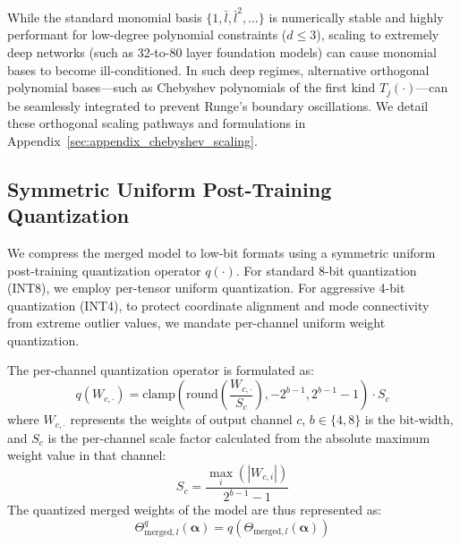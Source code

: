 While the standard monomial basis $\{1, \bar{l}, \bar{l}^2, \dots\}$ is numerically stable and highly performant for low-degree polynomial constraints ($d \le 3$), scaling to extremely deep networks (such as 32-to-80 layer foundation models) can cause monomial bases to become ill-conditioned. In such deep regimes, alternative orthogonal polynomial bases—such as Chebyshev polynomials of the first kind $T_j(\cdot)$—can be seamlessly integrated to prevent Runge's boundary oscillations. We detail these orthogonal scaling pathways and formulations in Appendix~\ref{sec:appendix_chebyshev_scaling}.

\subsection{Symmetric Uniform Post-Training Quantization}
We compress the merged model to low-bit formats using a symmetric uniform post-training quantization operator $q(\cdot)$.
For standard 8-bit quantization (INT8), we employ per-tensor uniform quantization. For aggressive 4-bit quantization (INT4), to protect coordinate alignment and mode connectivity from extreme outlier values, we mandate per-channel uniform weight quantization.

The per-channel quantization operator is formulated as:
\begin{equation}
q(W_{c, \cdot}) = \text{clamp}\left( \text{round}\left( \frac{W_{c, \cdot}}{S_c} \right), -2^{b-1}, 2^{b-1}-1 \right) \cdot S_c
\end{equation}
where $W_{c, \cdot}$ represents the weights of output channel $c$, $b \in \{4, 8\}$ is the bit-width, and $S_c$ is the per-channel scale factor calculated from the absolute maximum weight value in that channel:
\begin{equation}
S_c = \frac{\max_i(|W_{c, i}|)}{2^{b-1} - 1}
\end{equation}
The quantized merged weights of the model are thus represented as:
\begin{equation}
\Theta^q_{\text{merged}, l}(\boldsymbol{\alpha}) = q\left( \Theta_{\text{merged}, l}(\boldsymbol{\alpha}) \right)
\end{equation}

